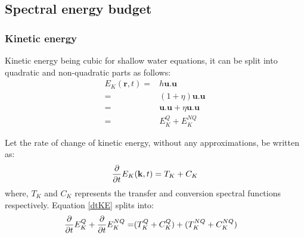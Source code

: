\subsection{Spectral energy budget}
\subsubsection{Kinetic energy}
Kinetic energy being cubic for shallow water equations, it can be split into 
quadratic and non-quadratic parts as follows:
\begin{align*}
  E_K(\mathbf{r},t)
    =& h\mathbf{u}.\mathbf{u}\\
    =& (1+\eta)\mathbf{u}.\mathbf{u}\\
    =& \mathbf{u}.\mathbf{u} + \eta\mathbf{u}.\mathbf{u}\\
    =& E_K^Q + E_K^{NQ}
\end{align*}

Let the rate of change of kinetic energy, without any approximations, be 
written as:
\begin{equation}\label{dtKE}
 \frac{\partial}{\partial t}E_K(\mathbf{k},t) = T_K + C_K
\end{equation}
where, $T_K$ and $C_K$ represents the transfer and conversion spectral 
functions respectively. Equation 
\eqref{dtKE} splits into:
\begin{align*}
 \frac{\partial}{\partial t}E_K^Q + \frac{\partial}{\partial t}E_K^{NQ}
 =&  (T_K^{Q} + C_K^{Q}) + (T_K^{NQ} + C_K^{NQ})
\end{align*}
